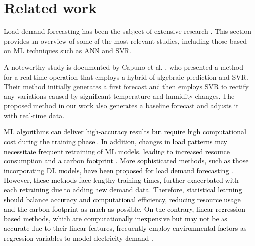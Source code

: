 \documentclass[journal, twoside]{IEEEtran}
\begin{document}
\section{Related work}
\label{sec:RelatedWork}
Load demand forecasting has been the subject of extensive research \cite{Nti2020,Abdul2021}. This section provides an overview of some of the most relevant studies, including those based on \ac{ML} techniques such as \ac{ANN}  \cite{Baric2019,Gunawan2021} and \ac{SVR}. 

A noteworthy study is documented by Capuno et al. \cite{Capuno2017}, who presented a method for a real-time operation that employs a hybrid of algebraic prediction and \ac{SVR}. Their method initially generates a first forecast and then employs \ac{SVR} to rectify any variations caused by significant temperature and humidity changes. The proposed method in our work also generates a baseline forecast and adjusts it with real-time data.

\textcolor{black}{ \ac{ML} algorithms can deliver high-accuracy results but require high computational cost during the training phase \cite{Ibrahim2022,Yadav2023,Makridakis2020}. In addition, changes in load patterns may necessitate frequent retraining of ML models, leading to increased resource consumption and a carbon footprint \cite{shamikEA2021}. More sophisticated methods, such as those incorporating \ac{DL} models, have been proposed for load demand forecasting  \cite{Tong2022,Ribeiro2022}. However, these methods face lengthy training times, further exacerbated with each retraining due to adding new demand data. Therefore, statistical learning should balance accuracy and computational efficiency, reducing resource usage and the carbon footprint as much as possible. On the contrary, linear regression-based methods, which are computationally inexpensive but may not be as accurate due to their linear features, frequently employ environmental factors as regression variables to model electricity demand \cite{Hannah2019}. }
\end{document}
